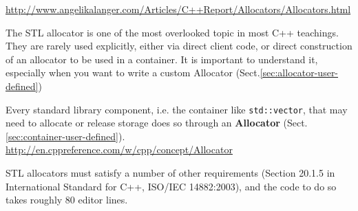 \begin{mdframed}

\url{http://www.angelikalanger.com/Articles/C++Report/Allocators/Allocators.html}

The STL allocator is one of the most overlooked topic in most C++ teachings.
They are rarely used explicitly, either via direct client code, or direct
construction of an allocator to be used in a container. It is important to
understand it, especially when you want to write a custom Allocator
(Sect.\ref{sec:allocator-user-defined})

Every standard library component, i.e. the container like \verb!std::vector!,
that may need to allocate or release storage does so through an {\bf Allocator}
(Sect.\ref{sec:container-user-defined}).
\url{http://en.cppreference.com/w/cpp/concept/Allocator}

STL allocators must satisfy a number of other requirements (Section 20.1.5 in
International Standard for C++, ISO/IEC 14882:2003), and the code to do so takes
roughly 80 editor lines.

\end{mdframed}

